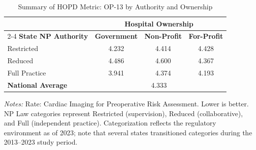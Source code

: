 \begin{table}[htbp]
    \centering
    \caption{Summary of HOPD Metric: OP-13 by Authority and Ownership}
    \label{tab:hopd_op_13}
    \vspace{0.2cm}
    \begin{tabular}{lccc}
        \toprule
        & \multicolumn{3}{c}{\textbf{Hospital Ownership}} \\
        \cmidrule(lr){2-4}
        \textbf{State NP Authority} & \textbf{Government} & \textbf{Non-Profit} & \textbf{For-Profit} \\
        \midrule
        Restricted & 4.232 & 4.414 & 4.428 \\
        Reduced & 4.486 & 4.600 & 4.367 \\
        Full Practice & 3.941 & 4.374 & 4.193 \\
        \midrule
        \textbf{National Average} & \multicolumn{3}{c}{4.333} \\
        \bottomrule
    \end{tabular}
    \vspace{0.1cm}
    \begin{minipage}{0.85\textwidth}
        \footnotesize \textit{Notes:} Rate: Cardiac Imaging for Preoperative Risk Assessment. Lower is better. NP Law categories represent Restricted (supervision), Reduced (collaborative), and Full (independent practice). Categorization reflects the regulatory environment as of 2023; note that several states transitioned categories during the 2013--2023 study period.
    \end{minipage}
\end{table}